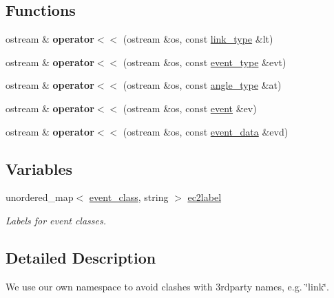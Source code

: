 \subsection*{Functions}
\begin{DoxyCompactItemize}
\item 
\mbox{\label{namespacetricl_a0c8560d9e6008454c78d640b04cfec39}} 
ostream \& {\bfseries operator$<$$<$} (ostream \&os, const \hyperlink{structtricl_1_1link__type}{link\+\_\+type} \&lt)
\item 
\mbox{\label{namespacetricl_a5d13ae5cc1aee2bdd17da12ffc29738b}} 
ostream \& {\bfseries operator$<$$<$} (ostream \&os, const \hyperlink{structtricl_1_1event__type}{event\+\_\+type} \&evt)
\item 
\mbox{\label{namespacetricl_a9412301333adf45d8ce1059cfaf1adb0}} 
ostream \& {\bfseries operator$<$$<$} (ostream \&os, const \hyperlink{structtricl_1_1angle__type}{angle\+\_\+type} \&at)
\item 
\mbox{\label{namespacetricl_a91e2fc74b8ef15e4fb23e5cab1f67da4}} 
ostream \& {\bfseries operator$<$$<$} (ostream \&os, const \hyperlink{structtricl_1_1event}{event} \&ev)
\item 
\mbox{\label{namespacetricl_a65ebcedfa43301fd5be2b2cf34a4b660}} 
ostream \& {\bfseries operator$<$$<$} (ostream \&os, const \hyperlink{structtricl_1_1event__data}{event\+\_\+data} \&evd)
\end{DoxyCompactItemize}
\subsection*{Variables}
\begin{DoxyCompactItemize}
\item 
unordered\+\_\+map$<$ \hyperlink{namespacetricl_a6967089e2c0837f273d8cb5fd9f7e46d}{event\+\_\+class}, string $>$ \hyperlink{namespacetricl_a321f250312d2a16a422999a72fc8eb4e}{ec2label}
\begin{DoxyCompactList}\small\item\em Labels for event classes. \end{DoxyCompactList}\end{DoxyCompactItemize}


\subsection{Detailed Description}
We use our own namespace to avoid clashes with 3rdparty names, e.\+g. \char`\"{}link\char`\"{}. 

